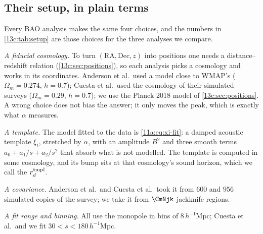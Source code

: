 \subsection{Their setup, in plain terms}
\label{13c:sec:repro-setup}

Every BAO analysis makes the same four choices, and the numbers in
\cref{13c:tab:setup} are those choices for the three analyses we compare.

\emph{A fiducial cosmology.} To turn $(\mathrm{RA},\mathrm{Dec},z)$ into positions one
needs a distance--redshift relation (\cref{13c:sec:positions}), so each analysis
picks a cosmology and works in its coordinates. Anderson et al.\ used a model close
to WMAP's ($\Omega_m=0.274$, $h=0.7$); Cuesta et al.\ used the cosmology of their
simulated surveys ($\Omega_m=0.29$, $h=0.7$); we use the Planck 2018 model of
\cref{13c:sec:positions}. A wrong choice does not bias the answer; it only moves the
peak, which is exactly what $\alpha$ measures.

\emph{A template.} The model fitted to the data is \eqref{11a:eq:xi-fit}: a damped
acoustic template $\xi_t$, stretched by $\alpha$, with an amplitude $B^2$ and three
smooth terms $a_0+a_1/s+a_2/s^2$ that absorb what is not modelled. The template is
computed in some cosmology, and its bump sits at that cosmology's sound horizon,
which we call the  $r_d^{\rm tmpl}$.

\emph{A covariance.} Anderson et al.\ and Cuesta et al.\ took it from $600$ and $956$
simulated copies of the survey; we take it from $\CmNjk$ jackknife regions.

\emph{A fit range and binning.} All use the monopole in bins of $8\,h^{-1}$Mpc;
Cuesta et al.\ and we fit $30<s<180\,h^{-1}$Mpc.

